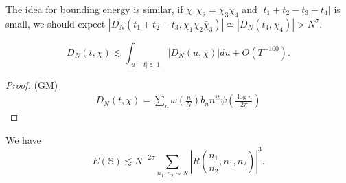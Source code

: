 The idea for bounding energy is similar, if $\chi_1\chi_2=\chi_3\chi_4$ and $|t_1+t_2-t_3-t_4|$ is small, we should expect $|D_N(t_1+t_2-t_3,\chi_1\chi_2\bar{\chi}_3)|\simeq |D_N(t_4,\chi_4)|>N^\sigma$.
\begin{lemma}
    \[
    D_N(t,\chi)\lesssim \int_{|u-t|\lesssim 1} |D_N(u,\chi)|du + O(T^{-100}).
    \]
\end{lemma}
\begin{proof}
    (GM)
    \begin{align*}
        D_N(t,\chi)=\sum_n \omega\left(\frac{n}{N}\right) b_n n^{it} \psi\left(\frac{\log n}{2\pi}\right)
    \end{align*}
\end{proof}
\begin{lemma} We have \[
    E(\mathbb{S})\lesssim N^{-2\sigma}\sum_{n_1,n_2\sim N}\left|R\left(\frac{n_1}{n_2},n_1,n_2\right) \right|^3.
    \]
    
\end{lemma}
